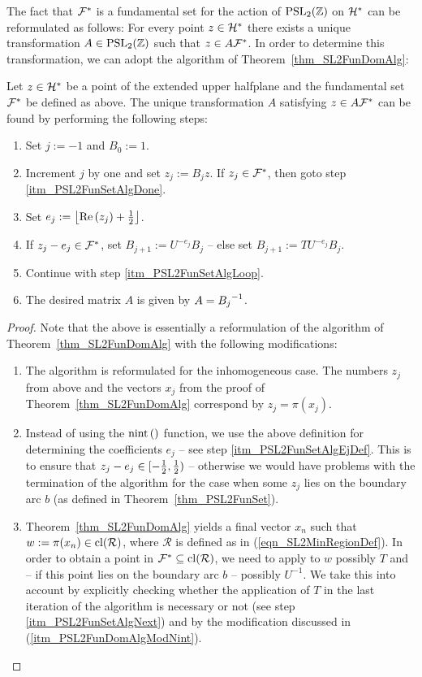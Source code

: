 The fact that $\mathcal{F}^\ast$ is a fundamental set for the action of $\operatorname{PSL}_{2}(\mathbb{Z})$ on $\mathcal{H}^\ast$ can be reformulated as follows: For every point $z \in \mathcal{H}^\ast$ there exists a unique transformation $A \in \operatorname{PSL}_{2}(\mathbb{Z})$ such that $z \in A \mathcal{F}^\ast$. In order to determine this transformation, we can adopt the algorithm of Theorem~\ref{thm_SL2FunDomAlg}:

\begin{theorem}
Let $z \in \mathcal{H}^\ast$ be a point of the extended upper halfplane and the fundamental set $\mathcal{F}^\ast$ be defined as above. The unique transformation $A$ satisfying $z \in A \mathcal{F}^\ast$ can be found by performing the following steps:
\begin{enumerate}
\item Set $j := -1$ and $B_0 := 1$.
\item \label{itm_PSL2FunSetAlgLoop}
Increment $j$ by one and set $z_j := B_j z$. If $z_j \in \mathcal{F}^\ast$, then goto step \ref{itm_PSL2FunSetAlgDone}.
\item \label{itm_PSL2FunSetAlgEjDef}
Set $e_j := \left\lfloor \operatorname{Re}\left(z_j\right) + \frac{1}{2} \right\rfloor$. 
\item \label{itm_PSL2FunSetAlgNext}
If $z_j - e_j \in \mathcal{F}^\ast$, set $B_{j+1} := U^{-e_j}B_j$ -- else set $B_{j+1} := TU^{-e_j}B_j$.
\item Continue with step \ref{itm_PSL2FunSetAlgLoop}.
\item \label{itm_PSL2FunSetAlgDone} 
The desired matrix $A$ is given by $A = {B_j}^{-1}$.
\end{enumerate}
\end{theorem}
\begin{proof}
Note that the above is essentially a reformulation of the algorithm of Theorem~\ref{thm_SL2FunDomAlg} with the following modifications:
\begin{enumerate}[\quad (a)]
\item The algorithm is reformulated for the inhomogeneous case. The numbers $z_j$ from above and the vectors $x_j$ from the proof of Theorem~\ref{thm_SL2FunDomAlg} correspond by $z_j = \pi(x_j)$.
\item \label{itm_PSL2FunDomAlgModNint}
Instead of using the $\operatorname{nint}\left(  \right)$ function, we use the above definition  for determining the coefficients $e_j$ -- see step \ref{itm_PSL2FunSetAlgEjDef}. This is to ensure that $z_j - e_j \in [-\frac{1}{2}, \frac{1}{2})$ -- otherwise we would have problems with the termination of the algorithm for the case when some $z_j$ lies on the boundary arc $b$ (as defined in Theorem~\ref{thm_PSL2FunSet}).
\item Theorem~\ref{thm_SL2FunDomAlg} yields a final vector $x_n$ such that $w := \pi(x_n) \in \operatorname{cl}(\mathcal{R})$, where $\mathcal{R}$ is defined as in (\ref{eqn_SL2MinRegionDef}). In order to obtain a point in $\mathcal{F}^\ast \subseteq \operatorname{cl}(\mathcal{R})$, we need to apply to $w$ possibly $T$ and -- if this point lies on the boundary arc $b$ -- possibly $U^{-1}$. We take this into account by explicitly checking whether the application of $T$ in the last iteration of the algorithm is necessary or not (see step \ref{itm_PSL2FunSetAlgNext}) and by the modification discussed in (\ref{itm_PSL2FunDomAlgModNint}).\qedhere
\end{enumerate}
\end{proof}

